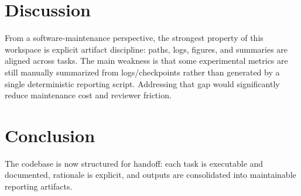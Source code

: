 \documentclass[11pt]{article}
\begin{document}
\section{Discussion}
From a software-maintenance perspective, the strongest property of this workspace is explicit artifact discipline: paths, logs, figures, and summaries are aligned across tasks. The main weakness is that some experimental metrics are still manually summarized from logs/checkpoints rather than generated by a single deterministic reporting script. Addressing that gap would significantly reduce maintenance cost and reviewer friction.

\section{Conclusion}
The codebase is now structured for handoff: each task is executable and documented, rationale is explicit,
and outputs are consolidated into maintainable reporting artifacts.
\end{document}
